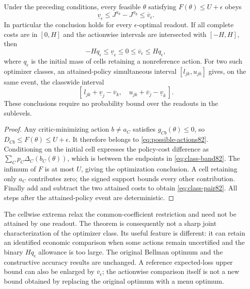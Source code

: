 \begin{theorem}\label{thm:actionwise82}
Under the preceding conditions, every feasible $\theta$ satisfying $F(\theta)\le U+\epsilon$ obeys
\begin{equation}\label{eq:uniform-cost82}
 \underline v_\epsilon\le J^{\pi_\theta}-J^{\pi_{\widehat\theta}}
                         \le\overline v_\epsilon.
\end{equation}
In particular the conclusion holds for every $\epsilon$-optimal readout. If all complete costs are in $[0,H]$ and the actionwise intervals are intersected with $[-H,H]$, then
\[
 -Hq_\epsilon\le\underline v_\epsilon\le0\le
       \overline v_\epsilon\le Hq_\epsilon,
\]
where $q_\epsilon$ is the initial mass of cells retaining a nonreference action.
For two such optimizer classes, an attained-policy simultaneous interval $[l_{jk},u_{jk}]$ gives, on the same event, the classwide interval
\begin{equation}\label{eq:class-pair82}
 [\,l_{jk}+\underline v_j-\overline v_k,\quad
       u_{jk}+\overline v_j-\underline v_k\,].
\end{equation}
These conclusions require no probability bound over the readouts in the sublevels.
\end{theorem}

\begin{proof}
Any critic-minimizing action $b\ne a_C$ satisfies $g_{Cb}(\theta)\le0$, so $D_{Cb}\le F(\theta)\le U+\epsilon$. It therefore belongs to \eqref{eq:possible-actions82}. Conditioning on the initial cell expresses the policy-cost difference as $\sum_Cp_C\Delta_C(b_C(\theta))$, which is between the endpoints in \eqref{eq:class-band82}. The infimum of $F$ is at most $U$, giving the optimization conclusion. A cell retaining only $a_C$ contributes zero; the signed support bounds every other contribution. Finally add and subtract the two attained costs to obtain \eqref{eq:class-pair82}. All steps after the attained-policy event are deterministic.
\end{proof}

The cellwise extrema relax the common-coefficient restriction and need not be attained by one readout. The theorem is consequently not a sharp joint characterization of the optimizer class. Its useful feature is different: it can retain an identified economic comparison when some actions remain uncertified and the binary $Hq_\epsilon$ allowance is too large. The original Bellman optimum and the constructive accuracy results are unchanged. A reference expected-loss upper bound can also be enlarged by $\overline v_\epsilon$; the actionwise comparison itself is not a new bound obtained by replacing the original optimum with a menu optimum.

